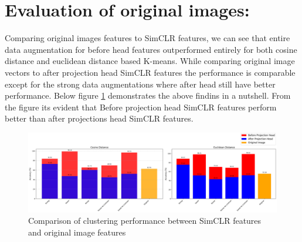 \section{Evaluation of original images:}
Comparing original images features to SimCLR features, we can see that entire data augmentation for  before head features outperformed entirely for both cosine distance and euclidean distance based K-means.
While comparing original image vectors to after projection head SimCLR features the performance is comparable except for the strong data augmentations where after head still have better performance. 
Below figure \ref{fig:cluster} demonstrates the above findins in a nutshell. From the figure its evident that Before projection head SimCLR features perform better than after projections head SimCLR features.
\begin{table}[H]
    \centering
    \caption{Evaluation Results Using Different Distance Metrics for original images}
    \label{tab:distance_metrics}
\end{table}

\begin{figure}[H]
    \centering
    \includegraphics[scale=0.37]{figures/cluster.png} 
    \caption{Comparison of clustering performance between SimCLR features and original image features}
    \label{fig:cluster}
\end{figure}

